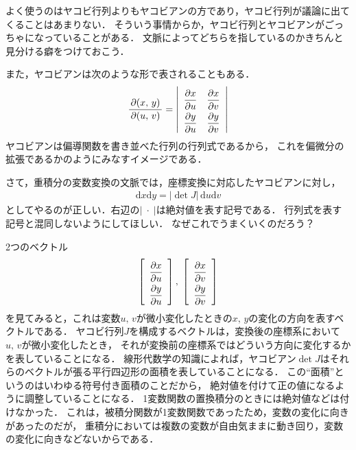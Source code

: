 よく使うのはヤコビ行列よりもヤコビアンの方であり，ヤコビ行列が議論に出てくることはあまりない．
そういう事情からか，ヤコビ行列とヤコビアンがごっちゃになっていることがある．
文脈によってどちらを指しているのかきちんと見分ける癖をつけておこう．

また，ヤコビアンは次のような形で表されることもある．
\begin{align}
\frac{ \partial (x, \, y)}{ \partial (u, \, v) } = 
\left \lvert
\renewcommand{\arraystretch}{2}
\begin{array}{cc}
\dfrac{ \partial x}{\partial u} & \dfrac{ \partial x}{\partial v} \\
\dfrac{ \partial y}{\partial u} & \dfrac{ \partial y}{\partial v} \\
\end{array}
\renewcommand{\arraystretch}{1}
\right \rvert
\label{eq:jacobian2}
\end{align}
ヤコビアンは偏導関数を書き並べた行列の行列式であるから，
これを偏微分の拡張であるかのようにみなすイメージである．

さて，重積分の変数変換の文脈では，座標変換に対応したヤコビアンに対し，
\begin{align}
\mathrm{d} x \mathrm{d}y = \lvert \det J \rvert \, \mathrm{d} u \mathrm{d}v
\label{eq:jacobimenseki}
\end{align}
としてやるのが正しい．右辺の$\lvert \; \cdot \; \rvert$は絶対値を表す記号である．
行列式を表す記号と混同しないようにしてほしい．
なぜこれでうまくいくのだろう？

2つのベクトル
\begin{align*}
\left[
\renewcommand{\arraystretch}{2}
\begin{array}{c}
\dfrac{ \partial x}{\partial u} \\
\dfrac{ \partial y}{\partial u}
\end{array}
\right]
, \; \left[
\renewcommand{\arraystretch}{2}
\begin{array}{c}
\dfrac{ \partial x}{\partial v} \\
\dfrac{ \partial y}{\partial v}
\end{array}
\right]
\renewcommand{\arraystretch}{1}
\end{align*}
を見てみると，これは変数$u, \, v$が微小変化したときの$x, \, y$の変化の方向を表すベクトルである．
ヤコビ行列$J$を構成するベクトルは，変換後の座標系において$u , \, v$が微小変化したとき，
それが変換前の座標系ではどういう方向に変化するかを表していることになる．
線形代数学の知識によれば，ヤコビアン$\det J$はそれらのベクトルが張る平行四辺形の面積を表していることになる．
この``面積''というのはいわゆる符号付き面積のことだから，
絶対値を付けて正の値になるように調整していることになる．
1変数関数の置換積分のときには絶対値などは付けなかった．
これは，被積分関数が1変数関数であったため，変数の変化に向きがあったのだが，
重積分においては複数の変数が自由気ままに動き回り，変数の変化に向きなどないからである．

